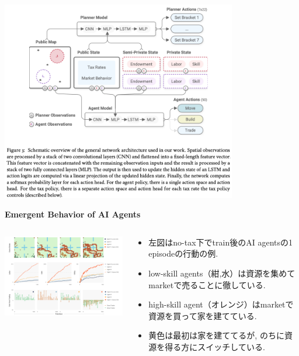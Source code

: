\documentclass[unicode,aspectratio=169,11pt]{beamer}
\begin{document}
\begin{frame}{}{}
    \begin{center}
        \includegraphics[width=10.3cm]{figure3.png}
    \end{center}
\end{frame}

\begin{frame}{}{}
    {\bf Emergent Behavior of AI Agents}
\begin{columns}[t]
    \begin{column}[]{0.6\textwidth}
        \begin{center}
            \includegraphics[width=9cm]{figure4.png}
        \end{center}
    \end{column}
    \begin{column}[]{0.4\textwidth}
        \begin{itemize}
            \item 左図はno-tax下でtrain後のAI agentsの1 episodeの行動の例.
            \item low-skill agents（紺,水）は資源を集めてmarketで売ることに徹している.
            \item high-skill agent（オレンジ）はmarketで資源を買って家を建てている.
            \item 黄色は最初は家を建ててるが, のちに資源を得る方にスイッチしている.
        \end{itemize}
    \end{column}
    
\end{columns}
\end{frame}
\end{document}
